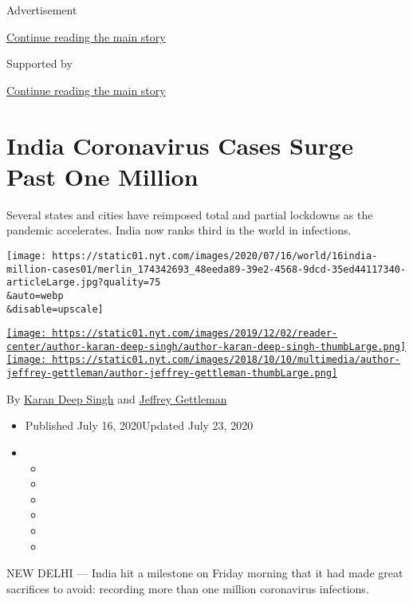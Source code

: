 Advertisement

\protect\hyperlink{after-top}{Continue reading the main story}

Supported by

\protect\hyperlink{after-sponsor}{Continue reading the main story}

\hypertarget{india-coronavirus-cases-surge-past-one-million}{%
\section{India Coronavirus Cases Surge Past One
Million}\label{india-coronavirus-cases-surge-past-one-million}}

Several states and cities have reimposed total and partial lockdowns as
the pandemic accelerates. India now ranks third in the world in
infections.

\texttt{[image: https://static01.nyt.com/images/2020/07/16/world/16india-million-cases01/merlin\_174342693\_48eeda89-39e2-4568-9dcd-35ed44117340-articleLarge.jpg?quality=75\\\&auto=webp\\\&disable=upscale]}

\href{https://www.nytimes.com/by/karan-deep-singh}{\texttt{[image: https://static01.nyt.com/images/2019/12/02/reader-center/author-karan-deep-singh/author-karan-deep-singh-thumbLarge.png]}}\href{https://www.nytimes.com/by/jeffrey-gettleman}{\texttt{[image: https://static01.nyt.com/images/2018/10/10/multimedia/author-jeffrey-gettleman/author-jeffrey-gettleman-thumbLarge.png]}}

By \href{https://www.nytimes.com/by/karan-deep-singh}{Karan Deep Singh}
and \href{https://www.nytimes.com/by/jeffrey-gettleman}{Jeffrey
Gettleman}

\begin{itemize}
\item
  Published July 16, 2020Updated July 23, 2020
\item
  \begin{itemize}
  \item
  \item
  \item
  \item
  \item
  \item
  \end{itemize}
\end{itemize}

NEW DELHI --- India hit a milestone on Friday morning that it had made
great sacrifices to avoid: recording more than one million coronavirus
infections.

